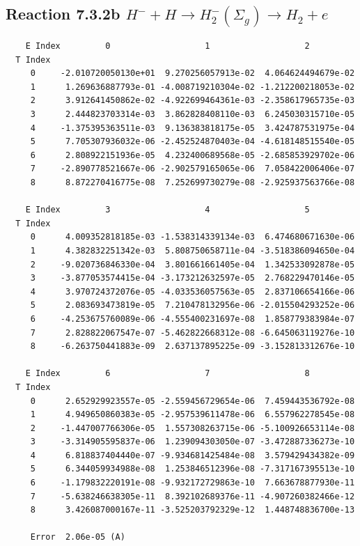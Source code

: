 \documentclass[12pt,dvipdfmx]{article}
\begin{document}
\newpage
\subsection{
Reaction 7.3.2b $  H^- + H \rightarrow H_2^-(\Sigma_g) \rightarrow H_2 + e$}


\begin{small}\begin{verbatim}
    E Index         0                   1                   2
  T Index
     0     -2.010720050130e+01  9.270256057913e-02  4.064624494679e-02
     1      1.269636887793e-01 -4.008719210304e-02 -1.212200218053e-02
     2      3.912641450862e-02 -4.922699464361e-03 -2.358617965735e-03
     3      2.444823703314e-03  3.862828408110e-03  6.245030315710e-05
     4     -1.375395363511e-03  9.136383818175e-05  3.424787531975e-04
     5      7.705307936032e-06 -2.452524870403e-04 -4.618148515540e-05
     6      2.808922151936e-05  4.232400689568e-05 -2.685853929702e-06
     7     -2.890778521667e-06 -2.902579165065e-06  7.058422006406e-07
     8      8.872270416775e-08  7.252699730279e-08 -2.925937563766e-08

    E Index         3                   4                   5
  T Index
     0      4.009352818185e-03 -1.538314339134e-03  6.474680671630e-06
     1      4.382832251342e-03  5.808750658711e-04 -3.518386094650e-04
     2     -9.020736846330e-04  3.801661661405e-04  1.342533092878e-05
     3     -3.877053574415e-04 -3.173212632597e-05  2.768229470146e-05
     4      3.970724372076e-05 -4.033536057563e-05  2.837106654166e-06
     5      2.083693473819e-05  7.210478132956e-06 -2.015504293252e-06
     6     -4.253675760089e-06 -4.555400231697e-08  1.858779383984e-07
     7      2.828822067547e-07 -5.462822668312e-08 -6.645063119276e-10
     8     -6.263750441883e-09  2.637137895225e-09 -3.152813312676e-10

    E Index         6                   7                   8
  T Index
     0      2.652929923557e-05 -2.559456729654e-06  7.459443536792e-08
     1      4.949650860383e-05 -2.957539611478e-06  6.557962278545e-08
     2     -1.447007766306e-05  1.557308263715e-06 -5.100926653114e-08
     3     -3.314905595837e-06  1.239094303050e-07 -3.472887336273e-10
     4      6.818837404440e-07 -9.934681425484e-08  3.579429434382e-09
     5      6.344059934988e-08  1.253846512396e-08 -7.317167395513e-10
     6     -1.179832220191e-08 -9.932172729863e-10  7.663678877930e-11
     7     -5.638246638305e-11  8.392102689376e-11 -4.907260382466e-12
     8      3.426087000167e-11 -3.525203792329e-12  1.448748836700e-13

     Error  2.06e-05 (A)
\end{verbatim}\end{small}
\end{document}
